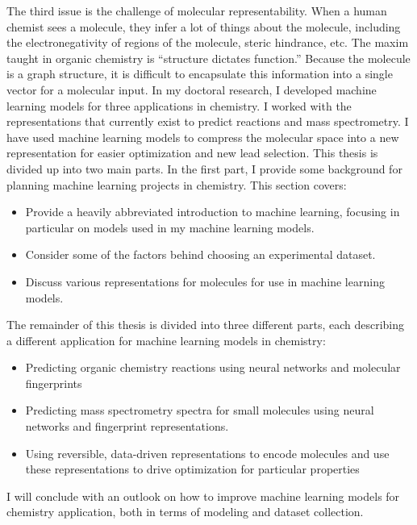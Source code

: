 The third issue is the challenge of molecular representability. When a human chemist sees a molecule, they infer a lot of things about the molecule, including the electronegativity of regions of the molecule, steric hindrance, etc. The maxim taught in organic chemistry is “structure dictates function.” Because the molecule is a graph structure, it is difficult to encapsulate this information into a single vector for a molecular input.
In my doctoral research, I developed machine learning models for three applications in chemistry. I worked with the representations that currently exist to predict reactions and mass spectrometry. I have used machine learning models to compress the molecular space into a new representation for easier optimization and new lead selection.
This thesis is divided up into two main parts. In the first part, I provide some background for planning machine learning projects in chemistry. This section covers:
\begin{itemize}
\item Provide a heavily abbreviated introduction to machine learning, focusing in particular on models used in my machine learning models.
\item Consider some of the factors behind choosing an experimental dataset.
\item Discuss various representations for molecules for use in machine learning models.
\end{itemize}
The remainder of this thesis is divided into three different parts, each describing a different application for machine learning models in chemistry: 
\begin{itemize}
\item Predicting organic chemistry reactions using neural networks and molecular fingerprints
\item Predicting mass spectrometry spectra for small molecules using neural networks and fingerprint representations.
\item Using reversible, data-driven representations to encode molecules and use these representations to drive optimization for particular properties
\end{itemize}
I will conclude with an outlook on how to improve machine learning models for chemistry application, both in terms of modeling and dataset collection.

